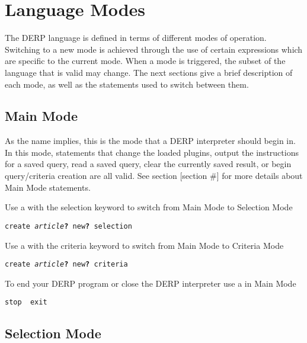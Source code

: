 \section{Language Modes}

The DERP language is defined in terms of different modes of operation.
Switching to a new mode is achieved through the use of certain expressions
which are specific to the current mode. When a mode is triggered, the
subset of the language that is valid may change. The next sections give
a brief description of each mode, as well as the statements used to switch between them.


\subsection{Main Mode}

As the name implies, this is the mode that a DERP interpreter should begin in. In this mode,
statements that change the loaded plugins, output the instructions for a saved query, read a
saved query, clear the currently saved result, or begin query/criteria creation are all valid.
See section [section \#] for more details about Main Mode statements.

Use a  with the selection keyword to switch from Main Mode to Selection Mode
\begin{description}[labelindent=1cm,leftmargin=\onelen,labelwidth=1cm]
     \texttt{create \textit{article}\textbf{?} new\textbf{?} selection}
\end{description}

Use a  with the criteria keyword to switch from Main Mode to Criteria Mode
\begin{description}[labelindent=1cm,leftmargin=\onelen,labelwidth=1cm]
     \texttt{create \textit{article}\textbf{?} new\textbf{?} criteria}
\end{description}

To end your DERP program or close the DERP interpreter use a  in Main Mode
\begin{description}[labelindent=1cm,leftmargin=\onelen,labelwidth=1cm]
     \texttt{stop \textbf{\textbar} exit}
\end{description}

\subsection{Selection Mode}

